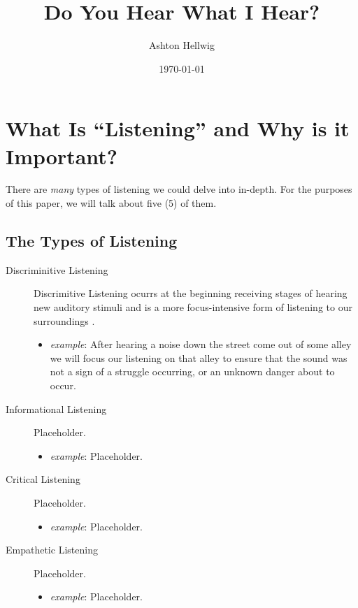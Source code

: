 \documentclass[stu,12pt]{apa7}
\title{%
    Do You Hear What I Hear?
  }
\author{Ashton Hellwig}
\date{\today}
\begin{document}
  \maketitle


  \section{What Is ``Listening'' and Why is it Important?}
    There are \textit{many} types of listening we could delve into in-depth.
      For the purposes of this paper, we will talk about five (5) of them.

    \subsection{The Types of Listening}
      \begin{description}
        \item[Discriminitive Listening]
          Discrimitive Listening ocurrs at the beginning receiving stages of
            hearing new auditory stimuli and is a more focus-intensive form
            of listening to our surroundings
            \parencite[pp. 333]{noauthor_communication_2013}.
          \begin{itemize}
            \item \textit{example}: After hearing a noise down the street come
              out of some alley we will focus our listening on that alley to
              ensure that the sound was not a sign of a struggle occurring, or
              an unknown danger about to occur.
          \end{itemize}
        \item[Informational Listening]
          Placeholder.
            \parencite[pp. 334]{noauthor_communication_2013}
          \begin{itemize}
            \item \textit{example}: Placeholder.
          \end{itemize}
        \item[Critical Listening]
          Placeholder.
            \parencite[pp. 334--335]{noauthor_communication_2013}
          \begin{itemize}
            \item \textit{example}: Placeholder.
          \end{itemize}
        \item[Empathetic Listening]
          Placeholder.
            \parencite[pp. 335--336]{noauthor_communication_2013}
          \begin{itemize}
            \item \textit{example}: Placeholder.
          \end{itemize}
      \end{description}
\end{document}
